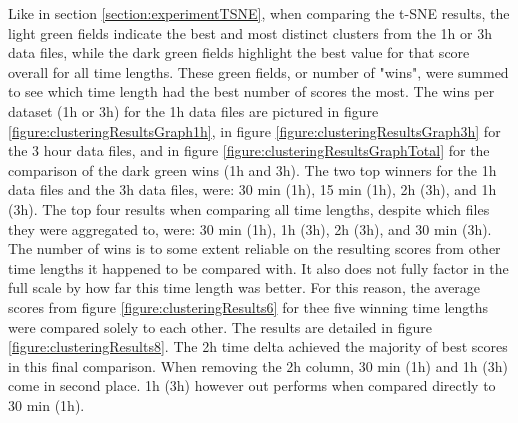 Like in section \ref{section:experimentTSNE}, when comparing the t-SNE results, the light green fields indicate the best and most distinct clusters from the 1h or 3h data files, while the dark green fields highlight the best value for that score overall for all time lengths. These green fields, or number of "wins", were summed to see which time length had the best number of scores the most. The wins per dataset (1h or 3h) for the 1h data files are pictured in figure \ref{figure:clusteringResultsGraph1h}, in figure \ref{figure:clusteringResultsGraph3h} for the 3 hour data files, and in figure \ref{figure:clusteringResultsGraphTotal} for the comparison of the dark green wins (1h and 3h). The two top winners for the 1h data files and the 3h data files, were: 30 min (1h), 15 min (1h), 2h (3h), and 1h (3h). The top four results when comparing all time lengths, despite which files they were aggregated to, were: 30 min (1h), 1h (3h), 2h (3h), and 30 min (3h). The number of wins is to some extent reliable on the resulting scores from other time lengths it happened to be compared with. It also does not fully factor in the full scale by how far this time length was better. For this reason, the average scores from figure \ref{figure:clusteringResults6} for thee five winning time lengths were compared solely to each other. The results are detailed in figure \ref{figure:clusteringResults8}. The 2h time delta achieved the majority of best scores in this final comparison. When removing the 2h column, 30 min (1h) and 1h (3h) come in second place. 1h (3h) however out performs when compared directly to 30 min (1h).







